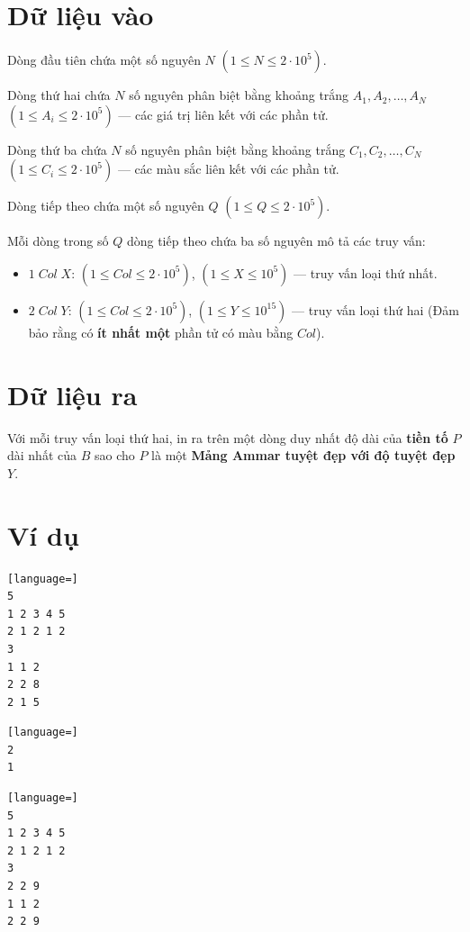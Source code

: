 \documentclass[12pt,a4paper]{article}
\begin{document}
\section*{Dữ liệu vào}
\begin{inputbox}
Dòng đầu tiên chứa một số nguyên $N$ $(1 \le N \le 2\cdot 10^5)$.

Dòng thứ hai chứa $N$ số nguyên phân biệt bằng khoảng trắng $A_1, A_2, \dots, A_N$ $(1 \le A_i \le 2 \cdot 10^5)$ — các giá trị liên kết với các phần tử.

Dòng thứ ba chứa $N$ số nguyên phân biệt bằng khoảng trắng $C_1, C_2, \dots, C_N$ $(1 \le C_i \le 2 \cdot 10^5)$ — các màu sắc liên kết với các phần tử.

Dòng tiếp theo chứa một số nguyên $Q$ $(1 \le Q \le 2\cdot 10^5)$.

Mỗi dòng trong số $Q$ dòng tiếp theo chứa ba số nguyên mô tả các truy vấn:
\begin{itemize}
    \item $1 \; Col \; X$: $(1 \le Col \le 2\cdot 10^5)$, $(1 \le X \le 10^5)$ — truy vấn loại thứ nhất.
    \item $2 \; Col \; Y$: $(1 \le Col \le 2\cdot 10^5)$, $(1 \le Y \le 10^{15})$ — truy vấn loại thứ hai (Đảm bảo rằng có \textbf{ít nhất một} phần tử có màu bằng $Col$).
\end{itemize}
\end{inputbox}

\section*{Dữ liệu ra}
\begin{outputbox}
Với mỗi truy vấn loại thứ hai, in ra trên một dòng duy nhất độ dài của \textbf{tiền tố} $P$ dài nhất của $B$ sao cho $P$ là một \textbf{Mảng Ammar tuyệt đẹp với độ tuyệt đẹp $Y$}.
\end{outputbox}

\section*{Ví dụ}
\begin{lstlisting}[language=]
5
1 2 3 4 5
2 1 2 1 2
3
1 1 2
2 2 8
2 1 5
\end{lstlisting}

\begin{lstlisting}[language=]
2
1
\end{lstlisting}

\begin{lstlisting}[language=]
5
1 2 3 4 5
2 1 2 1 2
3
2 2 9
1 1 2
2 2 9
\end{lstlisting}
\end{document}
